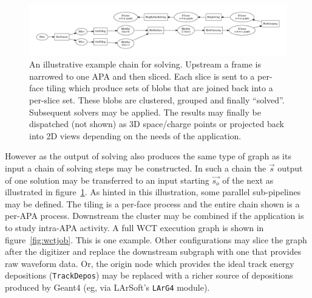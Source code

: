 \documentclass[11pt]{article}
\begin{document}
\begin{figure}[htbp]
\centering
\includegraphics[width=\textwidth]{figs/solving-pipeline-example.pdf}
\caption{\label{fig:chain}
An illustrative example chain for solving.  Upstream a frame is narrowed to one APA and then sliced.  Each slice is sent to a per-face tiling which produce sets of blobs that are joined back into a per-slice set.  These blobs are clustered, grouped and finally ``solved''.  Subsequent solvers may be applied.  The results may finally be dispatched (not shown) as 3D space/charge points or projected back into 2D views depending on the needs of the application.}
\end{figure}

However as the output of solving also produces the same type of graph as its input a chain of solving steps may be constructed. 
In such a chain the $\vec{s}$ output of one solution may be transferred to an input starting $\vec{s_o}$ of the next as illustrated in figure~\ref{fig:chain}.  As hinted in this illustration, some parallel sub-pipelines may be defined.  The tiling is a per-face process and the entire chain shown is a per-APA process.  Downstream the cluster may be combined if the application is to study intra-APA activity.  A full WCT execution graph is shown in figure~\ref{fig:wctjob}.  This is one example.  Other configurations may slice the graph after the digitizer and replace the downstream subgraph with one that provides raw waveform data.  Or, the origin node which provides the ideal track energy depositions (\texttt{TrackDepos}) may be replaced with a richer source of depositions produced by Geant4 (eg, via LArSoft's \texttt{LArG4} module).
\end{document}
